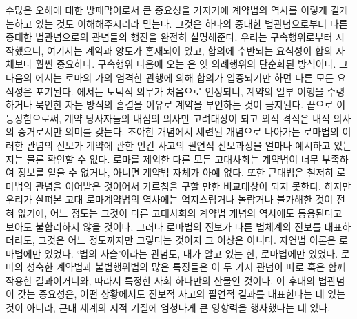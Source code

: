 수많은 오해에 대한 방패막이로서 큰 중요성을 가지기에
계약법의 역사를
이렇게
길게 논하고 있는 것도 이해해주시리라 믿는다.
그것은 하나의 중대한 법관념으로부터
다른 중대한 법관념으로의 관념들의 행진을 완전히 설명해준다.
우리는 구속행위로부터 시작했으니,
여기서는 계약과 양도가 혼재되어 있고,
합의에 수반되는 요식성이 합의 자체보다 훨씬 중요하다.
구속행위 다음에 오는 은 옛 의례행위의 단순화된 방식이다.
그 다음의 에서는
로마의 가의 엄격한 관행에 의해
합의가 입증되기만 하면 다른 모든 요식성은 포기된다.
에서는 도덕적 의무가 처음으로 인정되니,
계약의 일부 이행을 수령하거나 묵인한 자는
방식의 흠결을 이유로 계약을 부인하는 것이 금지된다.
끝으로 이 등장함으로써,
계약 당사자들의 내심의 의사만 고려대상이 되고
외적 격식은 내적 의사의 증거로서만 의미를 갖는다.
조야한 개념에서 세련된 개념으로 나아가는 로마법의 이러한 관념의 진보가
계약에 관한 인간 사고의 필연적 진보과정을 얼마나 예시하고 있는지는
물론 확인할 수 없다.
로마를 제외한 다른 모든 고대사회는
계약법이 너무 부족하여 정보를 얻을 수 없거나,
아니면 계약법 자체가 아예 없다.
또한 근대법은 철저히 로마법의 관념을 이어받은 것이어서
가르침을 구할 만한 비교대상이 되지 못한다.
하지만 우리가 살펴본 고대 로마계약법의 역사에는
억지스럽거나 놀랍거나 불가해한 것이 전혀 없기에,
어느 정도는 그것이
다른 고대사회의 계약법 개념의 역사에도 통용된다고
보아도 불합리하지 않을 것이다.
그러나 로마법의 진보가 다른 법체계의 진보를 대표하더라도,
그것은 어느 정도까지만 그렇다는 것이지 그 이상은 아니다.
자연법 이론은 로마법에만 있었다.
`법의 사슬'이라는 관념도, 내가 알고 있는 한,
로마법에만 있었다.
로마의 성숙한 계약법과 불법행위법의 많은 특징들은
이 두 가지  관념이 따로 혹은 함께 작용한 결과이거니와,
따라서 특정한 사회 하나만의 산물인 것이다.
이 후대의 법관념이 갖는 중요성은,
어떤 상황에서도 진보적 사고의 필연적 결과를 대표한다는 데
있는 것이 아니라,
근대 세계의 지적 기질에 엄청나게 큰 영향력을 행사했다는 데 있다.

